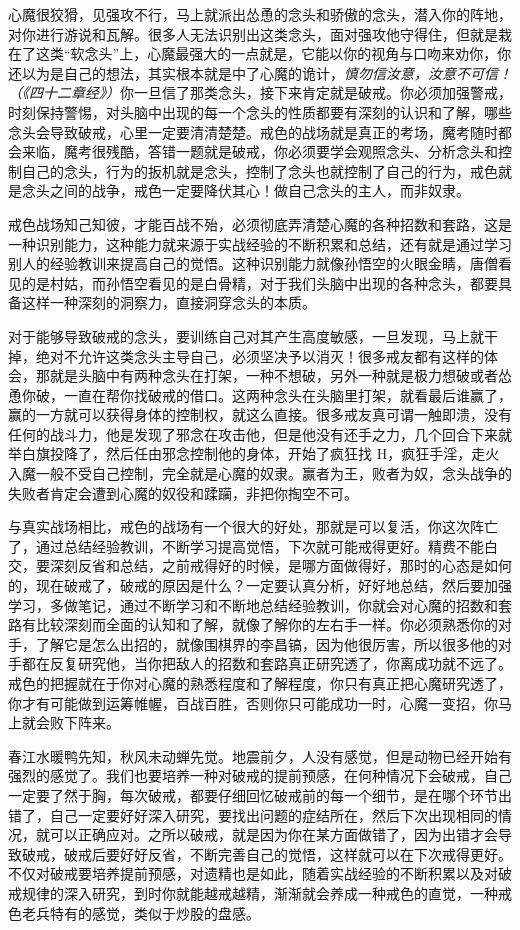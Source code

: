 心魔很狡猾，见强攻不行，马上就派出怂恿的念头和骄傲的念头，潜入你的阵地，对你进行游说和瓦解。很多人无法识别出这类念头，面对强攻他守得住，但就是栽在了这类“软念头”上，心魔最强大的一点就是，它能以你的视角与口吻来劝你，你还以为是自己的想法，其实根本就是中了心魔的诡计，\textit{慎勿信汝意，汝意不可信！（《四十二章经》）}你一旦信了那类念头，接下来肯定就是破戒。你必须加强警戒，时刻保持警惕，对头脑中出现的每一个念头的性质都要有深刻的认识和了解，哪些念头会导致破戒，心里一定要清清楚楚。戒色的战场就是真正的考场，魔考随时都会来临，魔考很残酷，答错一题就是破戒，你必须要学会观照念头、分析念头和控制自己的念头，行为的扳机就是念头，控制了念头也就控制了自己的行为，戒色就是念头之间的战争，戒色一定要降伏其心！做自己念头的主人，而非奴隶。

戒色战场知己知彼，才能百战不殆，必须彻底弄清楚心魔的各种招数和套路，这是一种识别能力，这种能力就来源于实战经验的不断积累和总结，还有就是通过学习别人的经验教训来提高自己的觉悟。这种识别能力就像孙悟空的火眼金睛，唐僧看见的是村姑，而孙悟空看见的是白骨精，对于我们头脑中出现的各种念头，都要具备这样一种深刻的洞察力，直接洞穿念头的本质。

对于能够导致破戒的念头，要训练自己对其产生高度敏感，一旦发现，马上就干掉，绝对不允许这类念头主导自己，必须坚决予以消灭！很多戒友都有这样的体会，那就是头脑中有两种念头在打架，一种不想破，另外一种就是极力想破或者怂恿你破，一直在帮你找破戒的借口。这两种念头在头脑里打架，就看最后谁赢了，赢的一方就可以获得身体的控制权，就这么直接。很多戒友真可谓一触即溃，没有任何的战斗力，他是发现了邪念在攻击他，但是他没有还手之力，几个回合下来就举白旗投降了，然后任由邪念控制他的身体，开始了疯狂找 H，疯狂手淫，走火入魔一般不受自己控制，完全就是心魔的奴隶。赢者为王，败者为奴，念头战争的失败者肯定会遭到心魔的奴役和蹂躏，非把你掏空不可。

与真实战场相比，戒色的战场有一个很大的好处，那就是可以复活，你这次阵亡了，通过总结经验教训，不断学习提高觉悟，下次就可能戒得更好。精费不能白交，要深刻反省和总结，之前戒得好的时候，是哪方面做得好，那时的心态是如何的，现在破戒了，破戒的原因是什么？一定要认真分析，好好地总结，然后要加强学习，多做笔记，通过不断学习和不断地总结经验教训，你就会对心魔的招数和套路有比较深刻而全面的认知和了解，就像了解你的左右手一样。你必须熟悉你的对手，了解它是怎么出招的，就像围棋界的李昌镐，因为他很厉害，所以很多他的对手都在反复研究他，当你把敌人的招数和套路真正研究透了，你离成功就不远了。戒色的把握就在于你对心魔的熟悉程度和了解程度，你只有真正把心魔研究透了，你才有可能做到运筹帷幄，百战百胜，否则你只可能成功一时，心魔一变招，你马上就会败下阵来。

春江水暖鸭先知，秋风未动蝉先觉。地震前夕，人没有感觉，但是动物已经开始有强烈的感觉了。我们也要培养一种对破戒的提前预感，在何种情况下会破戒，自己一定要了然于胸，每次破戒，都要仔细回忆破戒前的每一个细节，是在哪个环节出错了，自己一定要好好深入研究，要找出问题的症结所在，然后下次出现相同的情况，就可以正确应对。之所以破戒，就是因为你在某方面做错了，因为出错才会导致破戒，破戒后要好好反省，不断完善自己的觉悟，这样就可以在下次戒得更好。不仅对破戒要培养提前预感，对遗精也是如此，随着实战经验的不断积累以及对破戒规律的深入研究，到时你就能越戒越精，渐渐就会养成一种戒色的直觉，一种戒色老兵特有的感觉，类似于炒股的盘感。

